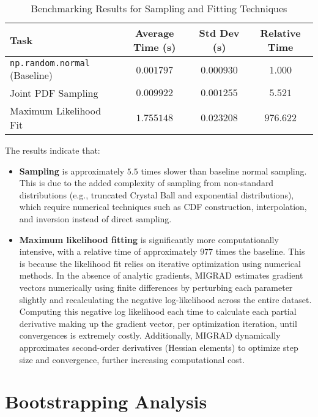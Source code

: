 \documentclass[11pt, a4paper]{article}
\begin{document}
\begin{table}[H]
    \centering
    \caption{Benchmarking Results for Sampling and Fitting Techniques}
    \label{tab:benchmark}
    \begin{tabular}{|l|c|c|c|}
        \hline
        \textbf{Task} & \textbf{Average Time (s)} & \textbf{Std Dev (s)} & \textbf{Relative Time} \\ \hline
        \texttt{np.random.normal} (Baseline) & \( 0.001797 \) & \( 0.000930 \) & \( 1.000 \) \\ \hline
        Joint PDF Sampling & \( 0.009922 \) & \( 0.001255 \) & \( 5.521 \) \\ \hline
        Maximum Likelihood Fit & \( 1.755148 \) & \( 0.023208 \) & \( 976.622 \) \\ \hline
    \end{tabular}
\end{table}

The results indicate that:
\begin{itemize}
    \item \textbf{Sampling} is approximately \( 5.5 \) times slower than baseline normal sampling. This is due to the added complexity of sampling from non-standard distributions (e.g., truncated Crystal Ball and exponential distributions), which require numerical techniques such as CDF construction, interpolation, and inversion instead of direct sampling.
    \item \textbf{Maximum likelihood fitting} is significantly more computationally intensive, with a relative time of approximately \( 977 \) times the baseline. This is because the likelihood fit relies on iterative optimization using numerical methods. In the absence of analytic gradients, MIGRAD estimates gradient vectors numerically using finite differences by perturbing each parameter slightly and recalculating the negative log-likelihood across the entire dataset. Computing this negative log likelihood each time to calculate each partial derivative making up the gradient vector, per optimization iteration, until convergences is extremely costly. Additionally, MIGRAD dynamically approximates second-order derivatives (Hessian elements) to optimize step size and convergence, further increasing computational cost.
    
\end{itemize}

\section{Bootstrapping Analysis}
\end{document}
